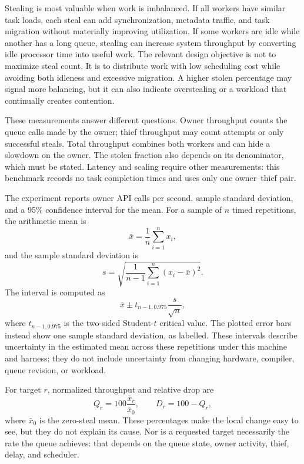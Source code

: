\documentclass[conference]{IEEEtran}
\begin{document}
Stealing is most valuable when work is imbalanced. If all workers have similar task loads, each steal can add synchronization, metadata traffic, and task migration without materially improving utilization. If some workers are idle while another has a long queue, stealing can increase system throughput by converting idle processor time into useful work. The relevant design objective is not to maximize steal count. It is to distribute work with low scheduling cost while avoiding both idleness and excessive migration. A higher stolen percentage may signal more balancing, but it can also indicate overstealing or a workload that continually creates contention.

These measurements answer different questions. Owner throughput counts the queue calls made by the owner; thief throughput may count attempts or only successful steals. Total throughput combines both workers and can hide a slowdown on the owner. The stolen fraction also depends on its denominator, which must be stated. Latency and scaling require other measurements: this benchmark records no task completion times and uses only one owner--thief pair.

The experiment reports owner API calls per second, sample standard deviation, and a 95\% confidence interval for the mean. For a sample of $n$ timed repetitions, the arithmetic mean is
\begin{equation}
  \bar{x}=\frac{1}{n}\sum_{i=1}^{n}x_i,
\end{equation}
and the sample standard deviation is
\begin{equation}
  s=\sqrt{\frac{1}{n-1}\sum_{i=1}^{n}(x_i-\bar{x})^2}.
\end{equation}
The interval is computed as
\begin{equation}
  \bar{x}\pm t_{n-1,0.975}\frac{s}{\sqrt{n}},
\end{equation}
where $t_{n-1,0.975}$ is the two-sided Student-$t$ critical value. The plotted error bars instead show one sample standard deviation, as labelled. These intervals describe uncertainty in the estimated mean across these repetitions under this machine and harness; they do not include uncertainty from changing hardware, compiler, queue revision, or workload.

For target $r$, normalized throughput and relative drop are
\begin{equation}
  Q_r=100\frac{\bar{x}_r}{\bar{x}_0},\qquad D_r=100-Q_r,
\end{equation}
where $\bar{x}_0$ is the zero-steal mean. These percentages make the local change easy to see, but they do not explain its cause. Nor is a requested target necessarily the rate the queue achieves: that depends on the queue state, owner activity, thief, delay, and scheduler.
\end{document}
